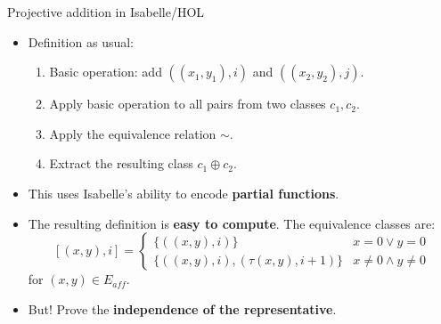 \documentclass[10pt]{beamer}
\begin{document}
\begin{frame}{Projective addition in Isabelle/HOL}
\begin{itemize}
	\item Definition as usual:
	\vspace{0.25cm}
	\begin{enumerate}
		\setlength\itemsep{0.75em}
		\item Basic operation: add $((x_1,y_1),i)$ and $((x_2,y_2),j)$.
		\item Apply basic operation to all pairs from two classes $c_1,c_2$.
		\item Apply the equivalence relation $\sim$.
		\item Extract the resulting class $c_1 \oplus c_2$.
	\end{enumerate}
\end{itemize}
\vspace{0.5cm}
\pause
\begin{itemize}	
	\item This uses Isabelle's ability to encode \textbf{partial functions}.
	\item The resulting definition is \textbf{easy to compute}. The equivalence classes are:
	\[[(x,y),i] = 
	\begin{cases}
	\{ ((x,y),i) \} & x = 0 \lor y = 0 \\
	\{ ((x,y),i), (\tau (x,y),i+1) \} & x \neq 0 \land y \neq 0
	\end{cases}\]
	for $(x,y) \in E_{aff}$.
	\item But! Prove the \textbf{independence of the representative}. 
\end{itemize}
\end{frame}
\end{document}
